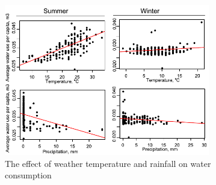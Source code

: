 \documentclass{sig-alternate}
\begin{document}
\begin{figure}[htp]
\centering
\includegraphics[width=0.8\textwidth]{images/waterusgexogvar}
\vspace{-5pt}
\caption{The effect of weather temperature and rainfall on water consumption}
\label{fig:waterusgexogvar}
\end{figure}
\end{document}
